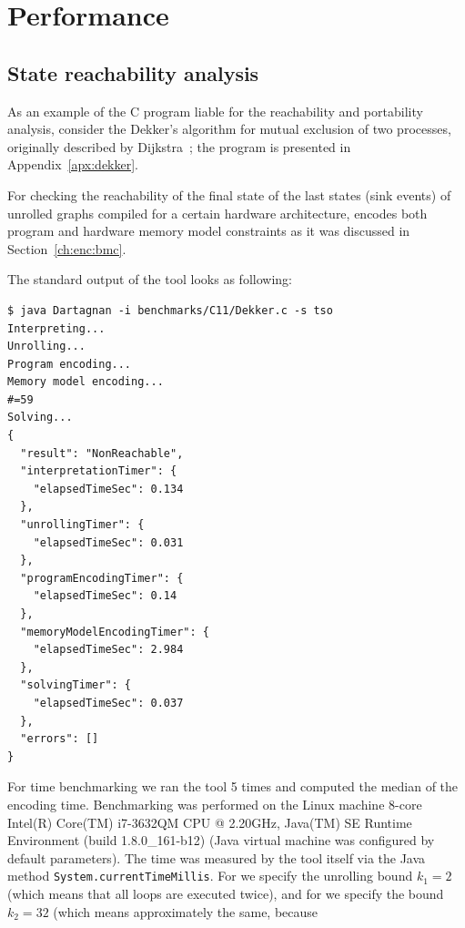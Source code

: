 \section{Performance}

\subsection{State reachability analysis}

As an example of the C program liable for the reachability and portability analysis, consider the Dekker's algorithm for mutual exclusion of two processes, originally described by Dijkstra~\cite{dijkstra1962over}; the program is presented in Appendix~\ref{apx:dekker}.

For checking the reachability of the final state of the last states (sink events) of unrolled graphs compiled for a certain hardware architecture, \porthos[2] encodes both program and hardware memory model constraints as it was discussed in Section~\ref{ch:enc:bmc}.


The standard output of the tool looks as following:
\begin{lstlisting}
$ java Dartagnan -i benchmarks/C11/Dekker.c -s tso
Interpreting...
Unrolling...
Program encoding...
Memory model encoding...
#=59
Solving...
{
  "result": "NonReachable",
  "interpretationTimer": {
    "elapsedTimeSec": 0.134
  },
  "unrollingTimer": {
    "elapsedTimeSec": 0.031
  },
  "programEncodingTimer": {
    "elapsedTimeSec": 0.14
  },
  "memoryModelEncodingTimer": {
    "elapsedTimeSec": 2.984
  },
  "solvingTimer": {
    "elapsedTimeSec": 0.037
  },
  "errors": []
}
\end{lstlisting}

For time benchmarking we ran the tool 5 times and computed the median of the encoding time.
Benchmarking was performed on the Linux machine 8-core Intel(R) Core(TM) i7-3632QM CPU @ 2.20GHz, Java(TM) SE Runtime Environment (build 1.8.0\_161-b12) (Java virtual machine was configured by default parameters).
The time was measured by the tool itself via the Java method \texttt{System.currentTimeMillis}.
For \porthos[1] we specify the unrolling bound $k_1 = 2$ (which means that all loops are executed twice), and for \porthos[2] we specify the bound $k_2 = 32$ (which means approximately the same, because


